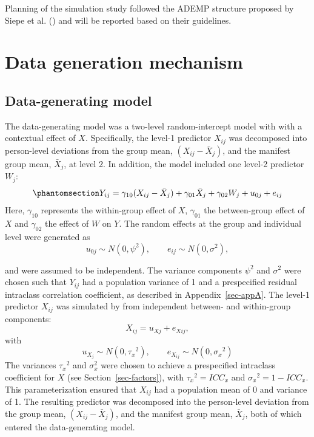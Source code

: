 \documentclass[
  letterpaper,
  11pt,
  english,
  singlespacing,
  headsepline,
  openany]{MastersDoctoralThesis}
\begin{document}
Planning of the simulation study followed the ADEMP structure proposed
by Siepe et al. () and will be reported based
on their guidelines.

\section{Data generation mechanism}\label{data-generation-mechanism}

\subsection{Data-generating model}\label{sec-dgm}

The data-generating model was a two-level random-intercept model with
with a contextual effect of \(X\). Specifically, the level-1 predictor
\(X_{ij}\) was decomposed into person-level deviations from the group
mean, \((X_{ij} - \bar{X}_j)\), and the manifest group mean,
\(\bar{X}_j\), at level 2. In addition, the model included one level-2
predictor \(W_j\): \begin{equation}\phantomsection\label{eq-dgm}{
\begin{aligned}
Y_{ij} =\gamma_{10} (X_{ij} - \bar{X}_j) +\gamma_{01} \bar{X}_j + \gamma_{02} W_j + u_{0j} + e_{ij} 
\end{aligned}
}\end{equation} Here, \(\gamma_{10}\) represents the within-group effect
of \(X\), \(\gamma_{01}\) the between-group effect of \(X\) and
\(\gamma_{02}\) the effect of \(W\) on \(Y\). The random effects at the
group and individual level were generated as \[
u_{0j} \sim N(0,\psi^2), \qquad e_{ij} \sim N(0,\sigma^2),
\]

and were assumed to be independent. The variance components \(\psi^2\)
and \(\sigma^2\) were chosen such that \(Y_{ij}\) had a population
variance of 1 and a prespecified residual intraclass correlation
coefficient, as described in Appendix~\ref{sec-appA}. The level-1
predictor \(X_{ij}\) was simulated by from independent between- and
within-group components: \[ 
X_{ij} = u_{Xj} + e_{Xij},
\] with \[
u_{X_j}\sim N(0,{\tau_x}^2), \qquad e_{X_{ij}}\sim N(0,{\sigma_x}^2) 
\] The variances \({\tau_x}^2\) and \(\sigma_x^2\) were chosen to
achieve a prespecified intraclass coefficient for \(X\) (see
Section~\ref{sec-factors}), with \({\tau_x}^2 = ICC_x\) and
\({\sigma_x}^2 = 1 - ICC_x\). This parameterization ensured that
\(X_{ij}\) had a population mean of 0 and variance of 1. The resulting
predictor was decomposed into the person-level deviation from the group
mean, \((X_{ij} - \bar{X}_j)\), and the manifest group mean,
\(\bar{X}_j\), both of which entered the data-generating model.
\end{document}
